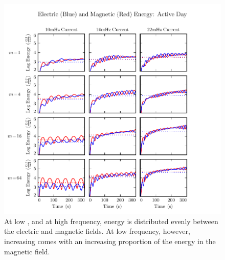 \begin{figure}[H]
    \centering
    \includegraphics[width=\textwidth]{figures/UB_UE_J_1.pdf}
    \caption[Current-Driven Electric and Magnetic Energy: Active Day]{
      At low \azm, and at high frequency, energy is distributed evenly between the electric and magnetic fields. At low frequency, however, increasing \azm comes with an increasing proportion of the energy in the magnetic field. 
    }
    \label{fig_UB_UE_J_1}
\end{figure}

